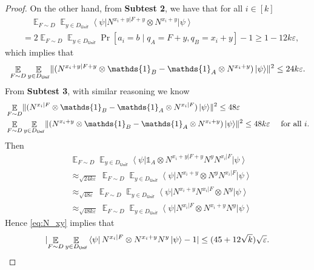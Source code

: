 \documentclass[11pt]{article}
\theoremstyle{plain}
\theoremstyle{definition}
\DeclarePairedDelimiter{\norm}{\lVert}{\rVert}
\DeclarePairedDelimiter{\abs}{\lvert}{\rvert}
\newcommand {\bra} [1] {\ensuremath{ \left\langle #1 \right| }}
\newcommand {\ket} [1] {\ensuremath{ \left| #1 \right\rangle }}
\DeclareMathOperator*{\bigE}{\mathbb{E}}
\newcommand {\id} {\ensuremath{\mathds{1}}}
\newcommand{\ep} {\ensuremath{\varepsilon}}
\newcommand{\x}{\otimes}
\newcommand{\appd}[1]{\approx_{#1}}
\newcommand{\1}{\mathbb{1}} %
\newcommand{\Unif}{\mathsf{Unif}}
\begin{document}
\begin{proof}
On the other hand, from \textbf{Subtest 2}, we have that for all $i \in [k]$
\begin{align*}
	&\quad \bigE_{F \sim D}  \bigE_{y \in D_{\Unif}} \bra{\psi} N^{x_i+y | F + y} \x N^{x_i+y} \ket{\psi} \\
	&= 2 \bigE_{F \sim D}  \bigE_{y \in D_{\Unif}} \Pr[a_i = b \mid q_A=F+y, q_B =x_i + y] - 1
	\geq 1 - 12k\ep,
\end{align*}
which implies that 
\begin{align*}
	\bigE_{F \sim D}  \bigE_{y \in D_{\Unif}} \norm{ (N^{x_i + y | F + y} \x \id_B- \id_A \x N^{x_i + y}) \ket{\psi} }^2 \leq 24k\ep.
\end{align*}
From \textbf{Subtest 3}, with similar reasoning we know
\begin{align*}
	&\bigE_{F \sim D} \norm{ (N^{x_i | F} \x \id_B - \id_A \x N^{x_i |F})\ket{\psi}}^2 \leq 48\ep \\
	&\bigE_{F \sim D}  \bigE_{y \in D_{\Unif}} \norm{ (N^{x_i + y} \x \id_B- \id_A \x N^{x_i + y}) \ket{\psi} }^2 \leq 48k\ep \quad \text{ for all } i.
\end{align*}
Then 
\begin{align*}
	&\bigE_{F \sim D}  \bigE_{y \in D_{\Unif}}  \bra{\psi} \id_A \x N^{x_i+y | F + y} N^y N^{x_i | F} \ket{\psi} \\
	&\appd{\sqrt{24 k\ep} } \bigE_{F \sim D}  \bigE_{y \in D_{\Unif}}  \bra{\psi} N^{x_i + y} \x N^y N^{x_i | F} \ket{\psi} \\
	&\appd{\sqrt{48\ep}} \bigE_{F \sim D}  \bigE_{y \in D_{\Unif}}  \bra{\psi} N^{x_i + y}N^{x_i | F}  \x N^y  \ket{\psi} \\
	&\appd{\sqrt{48k\ep}} \bigE_{F \sim D} \bigE_{y \in D_{\Unif}}  \bra{\psi}N^{x_i | F}  \x  N^{x_i + y} N^y  \ket{\psi}
\end{align*}
Hence \cref{eq:N_xy} implies that 
\begin{align}
	\label{eq:N_xy_noxi+y}
	\abs{ \bigE_{F \sim D}  \bigE_{y \in D_{\Unif}} \bra{\psi} N^{x_i| F} \x N^{x_i +y }N^y  \ket{\psi} -1 } \leq (45 + 12\sqrt{k})\sqrt{\ep}.
\end{align}


\end{proof}
\end{document}
